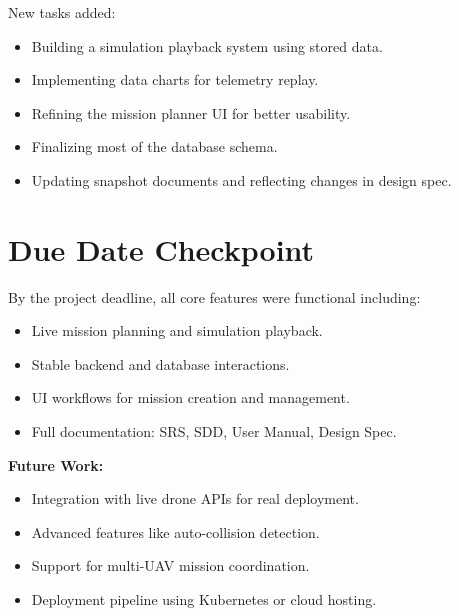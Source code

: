 \documentclass{article}
\begin{document}
New tasks added:
\begin{itemize}
    \item Building a simulation playback system using stored data.
    \item Implementing data charts for telemetry replay.
    \item Refining the mission planner UI for better usability.
    \item Finalizing most of the database schema.
    \item Updating snapshot documents and reflecting changes in design spec.
\end{itemize}

\section{Due Date Checkpoint}
By the project deadline, all core features were functional including:
\begin{itemize}
    \item Live mission planning and simulation playback.
    \item Stable backend and database interactions.
    \item UI workflows for mission creation and management.
    \item Full documentation: SRS, SDD, User Manual, Design Spec.
\end{itemize}

\textbf{Future Work:}
\begin{itemize}
    \item Integration with live drone APIs for real deployment.
    \item Advanced features like auto-collision detection.
    \item Support for multi-UAV mission coordination.
    \item Deployment pipeline using Kubernetes or cloud hosting.
\end{itemize}
\end{document}
